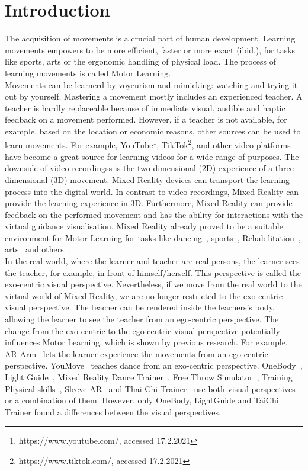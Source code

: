 \chapter{Introduction}
The acquisition of movements is a crucial part of human development\cite{mlbook}. Learning movements empowers to be more efficient, faster or more exact (ibid.), for tasks like sports, arts or the ergonomic handling of physical load. The process of learning movements is called Motor Learning.\\
Movements can be learnerd by voyeurism and mimicking: watching and trying it out by yourself. Mastering a movement mostly includes an experienced teacher. A teacher is hardly replaceable because of immediate visual, audible and haptic feedback on a movement performed. However, if a teacher is not available, for example, based on the location or economic reasons, other sources can be used to learn movements. For example, YouTube\footnote{https://www.youtube.com/, accessed 17.2.2021}, TikTok\footnote{https://www.tiktok.com/, accessed 17.2.2021}, and other video platforms have become a great source for learning videos for a wide range of purposes. The downside of video recordingss is the two dimensional (2D) experience of a three dimensional (3D) movement. Mixed Reality devices can transport the learning process into the digital world. In contrast to video recordings, Mixed Reality can provide the learning experience in 3D. Furthermore, Mixed Reality can provide feedback on the performed movement and has the ability for interactions with the virtual guidance visualisation. Mixed Reality already proved to be a suitable environment for Motor Learning for tasks like dancing~\cite{YouMove,vrdancetrainer,outsideme,performancetraining,mrdancetrainer}, sports~\cite{freethrowsimulator,trainingphysicalskills}, Rehabilitation~\cite{motionma,physioathome,kinohaptics,sleevear,veimprovesml}, arts~\cite{ararm,justfollowme,stylo,elearningma,mythaichicoaches,rtgesturerecognistion,onebody,thaichichua} and others~\cite{tikl,lightguide}.\\
In the real world, where the learner and teacher are real persons, the learner sees the teacher, for example, in front of himself/herself. This perspective is called the exo-centric visual perspective. Nevertheless, if we move from the real world to the virtual world of Mixed Reality, we are no longer restricted to the exo-centric visual perspective. The teacher can be rendered inside the learners's body, allowing the learner to see the teacher from an ego-centric perspective. The change from the exo-centric to the ego-centric visual perspective potentially influences Motor Learning, which is shown by previous research. For example, AR-Arm~\cite{ararm} lets the learner experience the movements from an ego-centric perspective. YouMove~\cite{YouMove} teaches dance from an exo-centric perspective. OneBody~\cite{onebody}, Light Guide~\cite{lightguide}, Mixed Reality Dance Trainer~\cite{mrdancetrainer}, Free Throw Simulator~\cite{freethrowsimulator}, Training Physical skills~\cite{trainingphysicalskills}, Sleeve AR~\cite{sleevear} and Thai Chi Trainer~\cite{thaichichua} use both visual perspectives or a combination of them. However, only OneBody, LightGuide and TaiChi Trainer found a differences between the visual perspectives.\\
